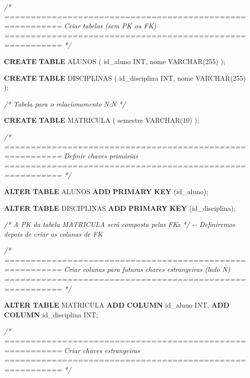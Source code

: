 \documentclass[
]{book}
\newenvironment{Shaded}{\begin{snugshade}}{\end{snugshade}}
\newcommand{\CommentTok}[1]{\textcolor[rgb]{0.56,0.35,0.01}{\textit{#1}}}
\newcommand{\DataTypeTok}[1]{\textcolor[rgb]{0.13,0.29,0.53}{#1}}
\newcommand{\DecValTok}[1]{\textcolor[rgb]{0.00,0.00,0.81}{#1}}
\newcommand{\KeywordTok}[1]{\textcolor[rgb]{0.13,0.29,0.53}{\textbf{#1}}}
\newcommand{\NormalTok}[1]{#1}
\begin{document}
\begin{Shaded}
\begin{Highlighting}[]
\CommentTok{/* =========================================================}
\CommentTok{   Criar tabelas (sem PK ou FK)}
\CommentTok{   ========================================================= */}

\KeywordTok{CREATE} \KeywordTok{TABLE}\NormalTok{ ALUNOS }
\NormalTok{(}
\NormalTok{    id\_aluno }\DataTypeTok{INT}\NormalTok{,}
\NormalTok{    nome }\DataTypeTok{VARCHAR}\NormalTok{(}\DecValTok{255}\NormalTok{)}
\NormalTok{);}

\KeywordTok{CREATE} \KeywordTok{TABLE}\NormalTok{ DISCIPLINAS }
\NormalTok{(}
\NormalTok{    id\_disciplina }\DataTypeTok{INT}\NormalTok{,}
\NormalTok{    nome }\DataTypeTok{VARCHAR}\NormalTok{(}\DecValTok{255}\NormalTok{)}
\NormalTok{);}

\CommentTok{/* Tabela para o relacionamento N:N */}

\KeywordTok{CREATE} \KeywordTok{TABLE}\NormalTok{ MATRICULA }
\NormalTok{(}
\NormalTok{    semestre }\DataTypeTok{VARCHAR}\NormalTok{(}\DecValTok{10}\NormalTok{)}
\NormalTok{);}

\CommentTok{/* =========================================================}
\CommentTok{   Definir chaves primárias}
\CommentTok{   ========================================================= */}

\KeywordTok{ALTER} \KeywordTok{TABLE}\NormalTok{ ALUNOS  }\KeywordTok{ADD} \KeywordTok{PRIMARY} \KeywordTok{KEY}\NormalTok{ (id\_aluno);}

\KeywordTok{ALTER} \KeywordTok{TABLE}\NormalTok{ DISCIPLINAS }\KeywordTok{ADD} \KeywordTok{PRIMARY} \KeywordTok{KEY}\NormalTok{ (id\_disciplina);}

\CommentTok{/* A PK da tabela MATRICULA será composta pelas FKs */}
\CommentTok{{-}{-} Definiremos depois de criar as colunas de FK}

\CommentTok{/* =========================================================}
\CommentTok{   Criar colunas para futuras chaves estrangeiras (lado N)}
\CommentTok{   ========================================================= */}

\KeywordTok{ALTER} \KeywordTok{TABLE}\NormalTok{ MATRICULA }\KeywordTok{ADD} \KeywordTok{COLUMN}\NormalTok{ id\_aluno }\DataTypeTok{INT}\NormalTok{, }\KeywordTok{ADD} \KeywordTok{COLUMN}\NormalTok{ id\_disciplina }\DataTypeTok{INT}\NormalTok{;}

\CommentTok{/* =========================================================}
\CommentTok{   Criar chaves estrangeiras}
\CommentTok{   ========================================================= */}


\end{Highlighting}
\end{Shaded}
\end{document}
